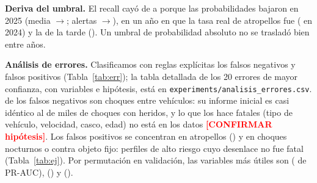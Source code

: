 \documentclass[conference]{IEEEtran}
\newcommand{\pend}[1]{\textcolor{red}{\textbf{[#1]}}}
\begin{document}
\textbf{Deriva del umbral.} El recall cayó de \CifraValRec{} a \CifraTestRec{} porque las probabilidades bajaron en 2025 (media
\CifraProbaVal{}$\to$\CifraProbaTest{}; alertas \CifraAlertaVal{}$\to$\CifraAlertaTest{}), en un año en que la tasa real de
atropellos fue \CifraAtropelloTest{} (\CifraAtropelloVal{} en 2024) y la de la tarde \CifraTardeTest{} (\CifraTardeVal{}). Un
umbral de probabilidad absoluto no se trasladó bien entre años.

\textbf{Análisis de errores.} Clasificamos con reglas explícitas los \CifraNFN{} falsos negativos y \CifraNFP{} falsos positivos
(Tabla~\ref{tab:err}); la tabla detallada de los 20 errores de mayor confianza, con variables e hipótesis, está en
\texttt{experiments/analisis\_errores.csv}. \CifraFNChoqueVeh{} de los \CifraNFN{} falsos negativos son choques entre vehículos:
su informe inicial es casi idéntico al de miles de choques con heridos, y lo que los hace fatales (tipo de vehículo, velocidad,
casco, edad) no está en los datos \pend{CONFIRMAR hipótesis}. Los falsos positivos se concentran en atropellos (\CifraFPAtropello{})
y en choques nocturnos o contra objeto fijo: perfiles de alto riesgo cuyo desenlace no fue fatal (Tabla~\ref{tab:ej}). Por
permutación en validación, las variables más útiles son \CifraImpUno{} (\CifraImpUnoVal{} de PR-AUC), \CifraImpDos{}
(\CifraImpDosVal{}) y \CifraImpTres{} (\CifraImpTresVal{}).

\begin{table}[t]
\caption{Errores en prueba por categoría}\label{tab:err}
\centering\resizebox{\columnwidth}{!}{}
\end{table}
\begin{table}[t]
\caption{Ejemplos de errores de mayor confianza (3 FN y 3 FP)}\label{tab:ej}
\centering\resizebox{\columnwidth}{!}{}
\end{table}

\end{document}
